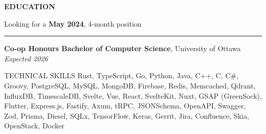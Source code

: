 \documentclass{resume}
\begin{document}
\color{primary}

\vspace{-8pt}

\sectionskip
\MakeUppercase{{\bf Education}}
\vspace{-21pt}
\begin{flushright}
	{Looking for a \textbf{May 2024}, 4-month position}
\end{flushright}
\sectionlineskip
\hrule %
\begin{list}{}{ %
		\setlength{\leftmargin}{0em} %
	}
	\item[] \textbf{Co-op Honours Bachelor of Computer Science}, University of Ottawa \hfill \textit{Expected 2026}
\end{list}

\vspace{-6pt}

\begin{rSection}{TECHNICAL SKILLS}
	Rust, TypeScript, Go, Python, Java, C++, C, C\#, Groovy,
	PostgreSQL, MySQL, MongoDB, Firebase, Redis, Memcached,
	Qdrant,
	InfluxDB, TimescaleDB,
	Svelte, Vue, React, SvelteKit, Nuxt, GSAP (GreenSock), Flutter,
	Express.js, Fastify, Axum, tRPC,
	JSONSchema, OpenAPI, Swagger, Zod,
	Prisma, Diesel, SQLx,
	TensorFlow, Keras,
	Gerrit, Jira, Confluence,
	Skia, OpenStack, Docker
\end{rSection}

\vspace{-8pt}
\end{document}
